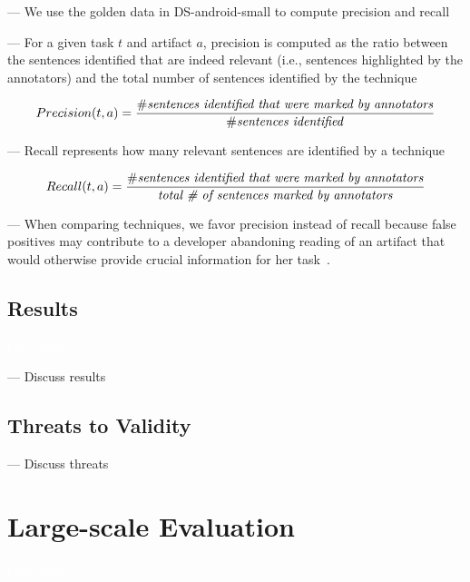 --- We use the golden data in \acs{DS-android-small} to compute precision and recall


--- For a given task $t$ and artifact $a$, precision is computed as the ratio between the sentences identified that are indeed relevant (i.e., sentences highlighted by the annotators) and the total number of sentences identified by the technique


\begin{equation}
    Precision(t, a) = \frac{\# \text{\textit{sentences identified that were marked by annotators}}}{\# \text{\textit{sentences identified}}}
\end{equation}

\vspace{3mm}

--- Recall represents how many relevant sentences are identified by a technique


\begin{equation}
    Recall(t, a) = \frac{\# \text{\textit{sentences identified that were marked by annotators}}}{\text{\textit{total \# of sentences marked by annotators}}}
\end{equation}

\vspace{3mm}

--- When comparing techniques, we favor precision instead of recall because false positives may contribute to a developer abandoning reading of an artifact that would otherwise provide crucial information for her task~\cite{Rastkar2010}.


\subsection{Results}
\textcolor{white}{force ident} %

--- Discuss results \vspace{3mm}

\subsection{Threats to Validity}

--- Discuss threats \vspace{3mm}



\section{Large-scale Evaluation}
\textcolor{white}{force ident} %

